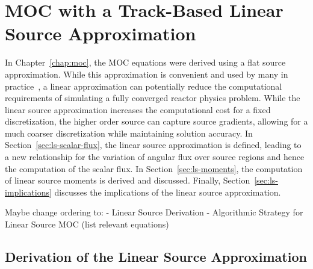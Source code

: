\chapter{MOC with a Track-Based Linear Source Approximation}
\label{chap:linear-source}

In Chapter~\ref{chap:moc}, the MOC equations were derived using a flat source approximation. While this approximation is convenient and used by many in practice~\cite{moc-codes}, a linear approximation can potentially reduce the computational requirements of simulating a fully converged reactor physics problem. While the linear source approximation increases the computational cost for a fixed discretization, the higher order source can capture source gradients, allowing for a much coarser discretization while maintaining solution accuracy. In Section~\ref{sec:ls-scalar-flux}, the linear source approximation is defined, leading to a new relationship for the variation of angular flux over source regions and hence the computation of the scalar flux. In Section~\ref{sec:ls-moments}, the computation of linear source moments is derived and discussed. Finally, Section~\ref{sec:ls-implications} discusses the implications of the linear source approximation.


Maybe change ordering to:
- Linear Source Derivation
- Algorithmic Strategy for Linear Source MOC (list relevant equations)

\section{Derivation of the Linear Source Approximation}
\label{sec:ls-derivation}

